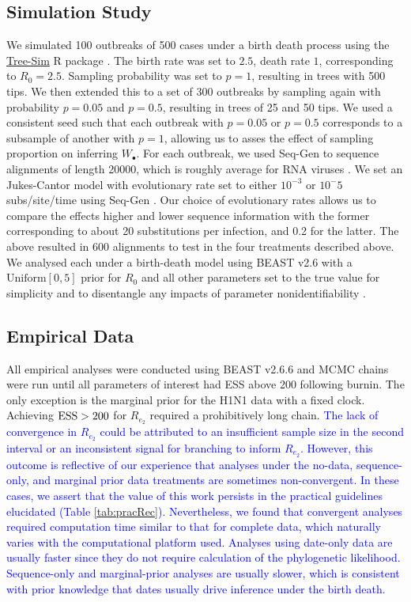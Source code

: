 \documentclass{article}
\begin{document}
\subsection*{Simulation Study}
We simulated 100 outbreaks of 500 cases under a birth death process using the \url{Tree-Sim} R package \citep{TreeSim}. The birth rate was set to $2.5$, death rate $1$, corresponding to $R_{0} = 2.5$. Sampling probability was set to $p=1$, resulting in trees with 500 tips. We then extended this to a set of 300 outbreaks by sampling again with probability $p=0.05$ and $p = 0.5$, resulting in trees of 25 and 50 tips. We used a consistent seed such that each outbreak with $p=0.05$ or $p=0.5$ corresponds to a subsample of another with $p=1$, allowing us to asses the effect of sampling proportion on inferring $W_{\bullet}$. For each outbreak, we used Seq-Gen to sequence alignments of length 20000, which is roughly average for RNA viruses \citep{sanjuan2010viral,rambaut_seq-gen_1997}. We set an Jukes-Cantor model with evolutionary rate set to either $10^{-3}$ or $10^-{5}$ subs/site/time using Seq-Gen \cite{rambaut_seq-gen_1997}.  Our choice of evolutionary rates allows us to compare the effects higher and lower sequence information with the former corresponding to about 20 substitutions per infection, and 0.2 for the latter. 
The above resulted in 600 alignments to test in the four treatments described above. We analysed each under a birth-death model using BEAST v2.6 \citet{bouckaert_beast_2019} with a $\textrm{Uniform}[0,5]$ prior for $R_0$ and all other parameters set to the true value for simplicity and to disentangle any impacts of parameter nonidentifiability \citep{louca2021fundamental}.

\subsection*{Empirical Data}
All empirical analyses were conducted using BEAST v2.6.6 \citep{bouckaert_beast_2019} and MCMC chains were run until all parameters of interest had ESS above 200 following burnin. The only exception is the marginal prior for the H1N1 data with a fixed clock. Achieving $\textnormal{ESS} > 200$ for $R_{e_2}$ required a prohibitively long chain. \textcolor{blue}{The lack of convergence in $R_{e_2}$ could be attributed to an insufficient sample size in the second interval or an inconsistent signal for branching to inform $R_{e_2}$. However, this outcome is reflective of our experience that analyses under the no-data, sequence-only, and marginal prior data treatments are sometimes non-convergent. In these cases, we assert that the value of this work persists in the practical guidelines elucidated (Table \ref{tab:pracRec}). Nevertheless, we found that convergent analyses required computation time similar to that for complete data, which naturally varies with the computational platform used. Analyses using date-only data are usually faster since they do not require calculation of the phylogenetic likelihood. Sequence-only and marginal-prior analyses are usually slower, which is consistent with prior knowledge that dates usually drive inference under the birth death.}
\end{document}
